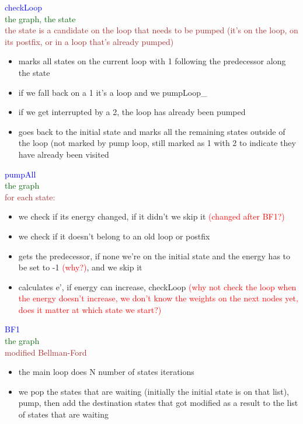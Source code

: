 \documentclass{rapport}
\begin{document}
\vspace{12pt}

\textcolor{blue}{checkLoop}\\
\textcolor[HTML]{006400}{the graph, the state}\\
\textcolor{brown}{the state is a candidate on the loop that needs to be pumped (it’s on the loop, on its postfix, or in a loop that’s already pumped)}
\begin{itemize}
    \item marks all states on the current loop with 1 following the predecessor along the state
    \item if we fall back on a 1 it’s a loop and we pumpLoop\_
    \item if we get interrupted by a 2, the loop has already been pumped
    \item goes back to the initial state and marks all the remaining states outside of the loop (not marked by pump loop, still marked as 1 with 2 to indicate they have already been visited
\end{itemize}

\vspace{12pt}

\textcolor{blue}{pumpAll}\\
\textcolor[HTML]{006400}{the graph}\\
\textcolor{brown}{for each state:}
\begin{itemize}
    \item we check if its energy changed, if it didn’t we skip it \textcolor{red}{(changed after BF1?)}
    \item we check if it doesn’t belong to an old loop or postfix
    \item gets the predecessor, if none we’re on the initial state and the energy has to be set to -1 \textcolor{red}{(why?)}, and we skip it
    \item calculates e’, if energy can increase, checkLoop \textcolor{red}{(why not check the loop when the energy doesn’t increase, we don’t know the weights on the next nodes yet, does it matter at which state we start?)}
\end{itemize}

\vspace{12pt}

\textcolor{blue}{BF1}\\
\textcolor[HTML]{006400}{the graph}\\ 
\textcolor{brown}{modified Bellman-Ford}
\begin{itemize}
    \item the main loop does N number of states iterations 
    \item we pop the states that are waiting (initially the initial state is on that list), pump, then add the destination states that got modified as a result to the list of states that are waiting 
\end{itemize}
\end{document}
